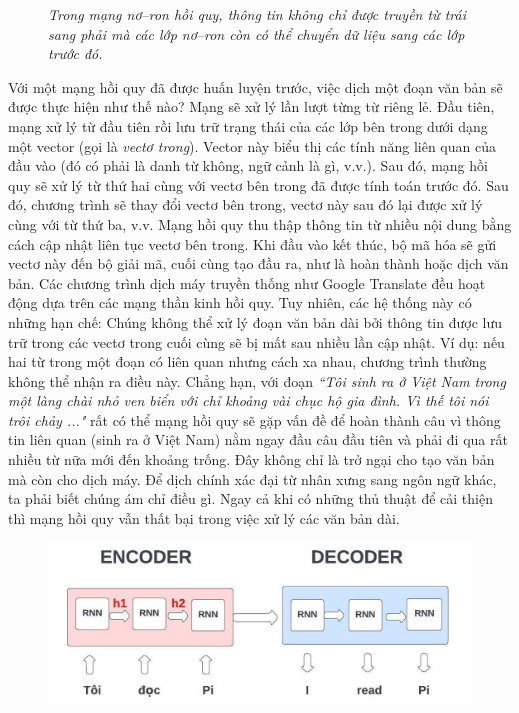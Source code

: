 \begin{multicols}{2}
\begin{figure}[H]
		\caption{\small\textit{\color{timhieukhoahoc}Trong mạng nơ--ron hồi quy, thông tin không chỉ được truyền từ trái sang phải mà các lớp nơ--ron còn có thể chuyển dữ liệu sang các lớp trước đó.}}
		\vspace*{-10pt}
	\end{figure}
	Với một mạng hồi quy đã được huấn luyện trước, việc dịch một đoạn văn bản sẽ được thực hiện như thế nào? Mạng sẽ xử lý lần lượt từng từ riêng lẻ. Đầu tiên, mạng xử lý từ đầu tiên rồi lưu trữ trạng thái của các lớp bên trong dưới dạng một vector (gọi là \textit{vectơ trong}). Vector này biểu thị các tính năng liên quan của đầu vào (đó có phải là danh từ không, ngữ cảnh là gì, v.v.). Sau đó, mạng hồi quy sẽ xử lý từ thứ hai cùng với vectơ bên trong đã được tính toán trước đó. Sau đó, chương trình sẽ thay đổi vectơ bên trong, vectơ này sau đó lại được xử lý cùng với từ thứ ba, v.v. Mạng hồi quy thu thập thông tin từ nhiều nội dung bằng cách cập nhật liên tục vectơ bên trong. Khi đầu vào kết thúc, bộ mã hóa sẽ gửi vectơ này đến bộ giải mã, cuối cùng tạo đầu ra, như là hoàn thành hoặc dịch văn bản.
	\vskip 0.1cm
	Các chương trình dịch máy truyền thống như Google Translate đều hoạt động dựa trên các mạng thần kinh hồi quy. Tuy nhiên, các hệ thống này có những hạn chế: Chúng không thể xử lý đoạn văn bản dài bởi thông tin được lưu trữ trong các vectơ trong cuối cùng sẽ bị mất sau nhiều lần cập nhật. Ví dụ: nếu hai từ trong một đoạn có liên quan nhưng cách xa nhau, chương trình thường không thể nhận ra điều này. Chẳng hạn, với đoạn \textit{``Tôi sinh ra ở Việt Nam trong một làng chài nhỏ ven biển với chỉ khoảng vài chục hộ gia đình. Vì thế tôi nói trôi chảy ..."} rất có thể mạng hồi quy sẽ gặp vấn đề để hoàn thành câu vì thông tin liên quan (sinh ra ở Việt Nam) nằm ngay đầu câu đầu tiên và phải đi qua rất nhiều từ nữa mới đến khoảng trống. Đây không chỉ là trở ngại cho tạo văn bản mà còn cho dịch máy. Để dịch chính xác đại từ nhân xưng sang ngôn ngữ khác, ta phải biết chúng ám chỉ điều gì. Ngay cả khi có những thủ thuật để cải thiện thì mạng hồi quy vẫn thất bại trong việc xử lý các văn bản dài. 
	\begin{figure}[H]
		\vspace*{-5pt}
		\centering
		\captionsetup{labelformat= empty, justification=centering}
		\includegraphics[width= 1\linewidth]{Encoder_Decoder.jpeg}

\end{figure}
\end{multicols}
